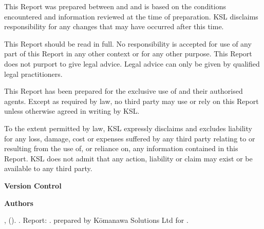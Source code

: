This Report was prepared between \reportstartdate{} and \reportenddate{} and is based on the conditions encountered and information reviewed at the time of preparation. KSL disclaims responsibility for any changes that may have occurred after this time.

This Report should be read in full. No responsibility is accepted for use of any part of this Report in any other context or for any other purpose. This Report does not purport to give legal advice. Legal advice can only be given by qualified legal practitioners.

This Report has been prepared for the exclusive use of \client{} and their authorised agents. Except as required by law, no third party may use or rely on this Report unless otherwise agreed in writing by KSL.

To the extent permitted by law, KSL expressly disclaims and excludes liability for any loss, damage, cost or expenses suffered by any third party relating to or resulting from the use of, or reliance on, any information contained in this Report. KSL does not admit that any action, liability or claim may exist or be available to any third party.

\newpage

\color{ksldarkblue} \LARGE \textbf{Version Control}
\color{black} \normalsize



\color{ksldarkblue} \LARGE \textbf{Authors}
\color{black} \normalsize

\authors




\begin{breakawaybox}[label={box:sugcite}, title=Suggested Citation, flushleft title]
    \textbf{\authorcite{}},
    (\getYear{\reportenddate}). \textit{\reporttitle{}}.
    Report: \projcode{}.\nthreport{} prepared by Kōmanawa Solutions Ltd for \client.
\end{breakawaybox}

\newpage